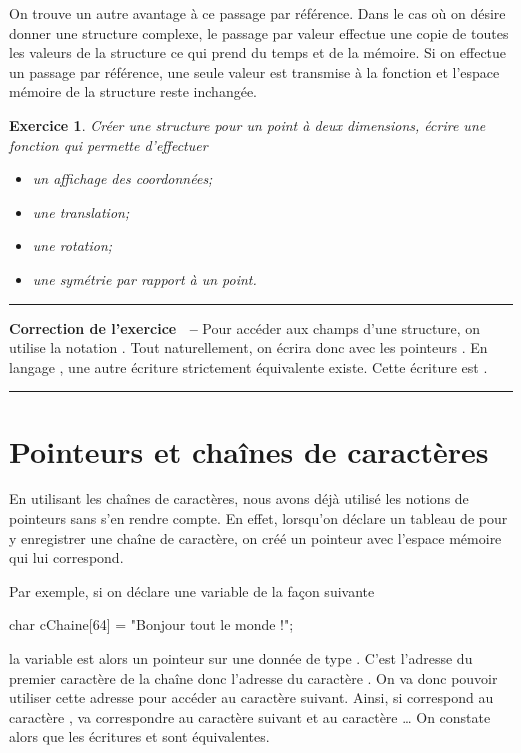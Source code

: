 \documentclass[a4paper]{article}
\newtheorem{Exo}{Exercice}
\newenvironment{Correction}{\par\tiny\blue\rule[1ex]{\textwidth}{1pt}\par\normalsize\textbf{Correction de l'exercice~\theExo{} -- }}{\par\tiny\blue\rule[1ex]{\textwidth}{1pt}\par}
\begin{document}
		On trouve un autre avantage à ce passage par référence.
		Dans le cas où on désire donner une structure complexe, le passage par valeur effectue une copie de toutes les valeurs de la structure ce qui prend du temps et de la mémoire.
		Si on effectue un passage par référence, une seule valeur est transmise à la fonction et l'espace mémoire de la structure reste inchangée.
		\begin{Exo}
			Créer une structure  pour un point à deux dimensions, écrire une fonction qui permette d'effectuer
			\begin{itemize}
				\item un affichage des coordonnées;
				\item une translation;
				\item une rotation;
				\item une symétrie par rapport à un point.
			\end{itemize}
		\end{Exo}
		\begin{Correction}
			Pour accéder aux champs d'une structure, on utilise la notation .
			Tout naturellement, on écrira donc avec les pointeurs .
			En langage , une autre écriture strictement équivalente existe.
			Cette écriture est .
		\end{Correction}
	\section{Pointeurs et chaînes de caractères}
		En utilisant les chaînes de caractères, nous avons déjà utilisé les notions de pointeurs sans s'en rendre compte.
		En effet, lorsqu'on déclare un tableau de  pour y enregistrer une chaîne de caractère, on créé un pointeur avec l'espace mémoire qui lui correspond.

		Par exemple, si on déclare une variable  de la façon suivante
		\begin{Code*}
char cChaine[64] = "Bonjour tout le monde !";
		\end{Code*}
		la variable est alors un pointeur sur une donnée de type .
		C'est l'adresse du premier caractère de la chaîne donc l'adresse du caractère .
		On va donc pouvoir utiliser cette adresse pour accéder au caractère suivant.
		Ainsi, si  correspond au caractère ,  va correspondre au caractère suivant  et  au caractère \dots{}
		On constate alors que les écritures  et  sont équivalentes.
\end{document}
